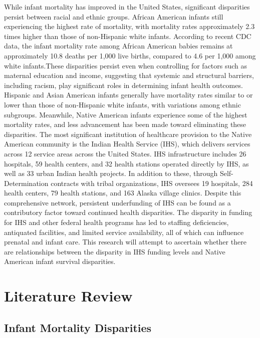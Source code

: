 \documentclass[12pt]{article}
\begin{document}
While infant mortality has improved in the United States, significant
disparities persist between racial and ethnic groups.
African American infants still experiencing the highest rate of mortality, with mortality rates approximately 2.3 times higher than those of non-Hispanic white infants. According to recent CDC data, the infant mortality rate among African American babies remains at approximately 10.8 deaths per 1,000 live births, compared to 4.6 per 1,000 among white infants.\newline These disparities persist even when controlling for factors such as maternal education and income, suggesting that systemic and structural barriers, including racism, play significant roles in determining infant health outcomes.
Hispanic and Asian American infants generally have mortality rates similar to or lower than those of non-Hispanic white infants, with variations among ethnic subgroups. Meanwhile,
Native American infants experience some of the highest mortality rates,
and less advancement has been made toward eliminating these disparities.\newline
The most significant institution of healthcare provision to the Native American community is the Indian Health Service (IHS), which delivers services across 12 service areas across the United States. IHS infrastructure includes 26 hospitals, 59 health centers, and 32 health stations operated directly by IHS, as well as 33 urban Indian health projects. In addition to these, through Self-Determination contracts with tribal organizations, IHS oversees 19 hospitals, 284 health centers, 79 health stations, and 163 Alaska village clinics. Despite this comprehensive network, persistent underfunding of IHS can be found as a contributory factor toward continued health disparities. The disparity in funding for IHS and other federal health programs has led to staffing deficiencies, antiquated facilities, and limited service availability, all of which can influence prenatal and infant care. This research will attempt to ascertain whether there are relationships between the disparity in IHS funding levels and Native American infant survival disparities.

\section{Literature Review}

\subsection{Infant Mortality Disparities}
\end{document}
